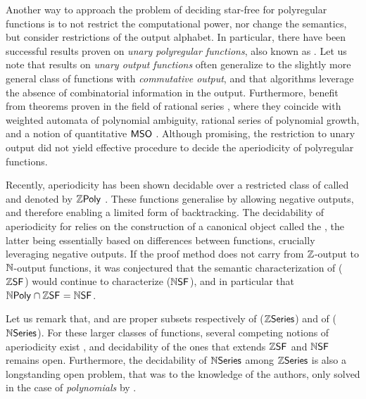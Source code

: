Another way to approach the problem of deciding star-free for polyregular
functions is to not restrict the computational power, nor change the semantics,
but consider restrictions of the output alphabet. In particular, there have
been successful results proven on \emph{unary polyregular functions}, also
known as 
\cite{doueneau2021pebble,doueneau2022hiding}. Let us note that results on
\emph{unary output functions} often generalize to the slightly more general
class of functions with \emph{commutative output}, and that algorithms leverage
the absence of combinatorial information in the output. Furthermore,
 benefit from theorems proven in the field of
rational series \cite{berstel2011noncommutative}, where they coincide with
weighted automata of polynomial ambiguity, rational series of polynomial
growth, and a notion of quantitative $\mathsf{MSO}$
\cite{berstel2011noncommutative,kreutzer2013,schutzenberger1962}. Although
promising, the restriction to unary output did not yield effective procedure to
decide the aperiodicity of polyregular functions. 


Recently, aperiodicity has been shown decidable over a restricted class of
 called  and denoted
by $\ZPoly$ \cite{LOPEZ23b}.  These functions generalise  by allowing negative outputs, and therefore enabling a limited form
of backtracking. The decidability of aperiodicity for  relies on the construction of a canonical object called the
, the latter being essentially based on differences
between functions, crucially leveraging negative outputs.
If the proof method does not carry from $\mathbb{Z}$-output to $\mathbb{N}$-output
functions, it was conjectured that the semantic characterization of  ($\ZSF$) would continue to characterize
 ($\NSF$), and in particular that
$\NPoly \cap \ZSF = \NSF$.

Let us remark that,  and
 are proper subsets respectively of
 ($\mathbb{Z}\mathsf{Series}$) and of 
($\mathbb{N}\mathsf{Series}$). For these larger classes of functions, several competing notions of
aperiodicity exist \cite{droste2019aperiodic,reutenauer_series_1980,LOPEZ23b},
and decidability of the ones that extends $\ZSF$ and $\NSF$ remains open.
Furthermore, the decidability of $\mathbb{N}\mathsf{Series}$ among $\mathbb{Z}\mathsf{Series}$ is also a longstanding
open problem, that was to the knowledge of the authors, only solved in the case
of \emph{polynomials} by \textcite{KARH77}.

